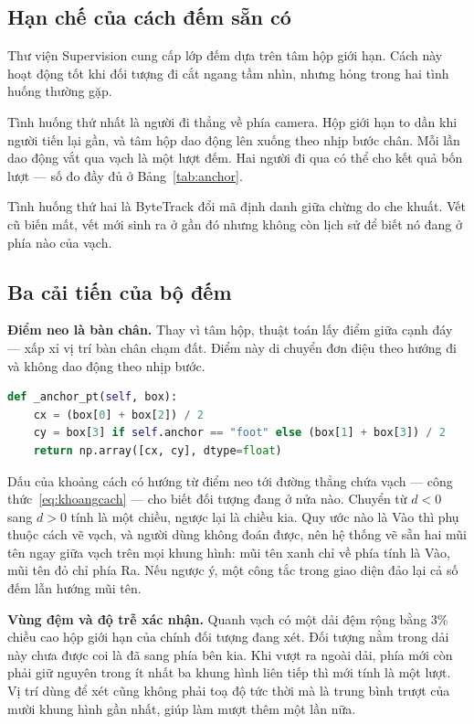 \subsection{Hạn chế của cách đếm sẵn có}

Thư viện Supervision cung cấp lớp  đếm dựa trên tâm hộp giới hạn.
Cách này hoạt động tốt khi đối tượng đi cắt ngang tầm nhìn, nhưng hỏng trong hai
tình huống thường gặp.

Tình huống thứ nhất là người đi thẳng về phía camera. Hộp giới hạn to dần khi
người tiến lại gần, và tâm hộp dao động lên xuống theo nhịp bước chân. Mỗi lần
dao động vắt qua vạch là một lượt đếm. Hai người đi qua có thể cho kết quả bốn
lượt --- số đo đầy đủ ở Bảng~\ref{tab:anchor}.

Tình huống thứ hai là ByteTrack đổi mã định danh giữa chừng do che khuất. Vết cũ
biến mất, vết mới sinh ra ở gần đó nhưng không còn lịch sử để biết nó đang ở phía
nào của vạch.

\subsection{Ba cải tiến của bộ đếm}

\textbf{Điểm neo là bàn chân.} Thay vì tâm hộp, thuật toán lấy điểm giữa cạnh đáy
--- xấp xỉ vị trí bàn chân chạm đất. Điểm này di chuyển đơn điệu theo hướng đi và
không dao động theo nhịp bước.

\begin{lstlisting}[language=Python, caption={Chọn điểm neo, trích từ \code{app/counter.py}}]
def _anchor_pt(self, box):
    cx = (box[0] + box[2]) / 2
    cy = box[3] if self.anchor == "foot" else (box[1] + box[3]) / 2
    return np.array([cx, cy], dtype=float)
\end{lstlisting}

Dấu của khoảng cách có hướng từ điểm neo tới đường thẳng chứa vạch --- công
thức~\eqref{eq:khoangcach} --- cho biết đối tượng đang ở nửa nào. Chuyển từ $d < 0$
sang $d > 0$ tính là một chiều, ngược lại là chiều kia. Quy ước nào là Vào thì phụ
thuộc cách vẽ vạch, và người dùng không đoán được, nên hệ thống vẽ sẵn hai mũi tên ngay
giữa vạch trên mọi khung hình: mũi tên xanh chỉ về phía tính là Vào, mũi tên đỏ chỉ
phía Ra. Nếu ngược ý, một công tắc trong giao diện đảo lại cả số đếm lẫn hướng mũi tên.

\textbf{Vùng đệm và độ trễ xác nhận.} Quanh vạch có một dải đệm rộng bằng 3\% chiều
cao hộp giới hạn của chính đối tượng đang xét. Đối tượng nằm trong dải này chưa
được coi là đã sang phía bên kia. Khi vượt ra ngoài dải, phía mới còn phải giữ
nguyên trong ít nhất ba khung hình liên tiếp thì mới tính là một lượt. Vị trí dùng
để xét cũng không phải toạ độ tức thời mà là trung bình trượt của mười khung hình
gần nhất, giúp làm mượt thêm một lần nữa.

